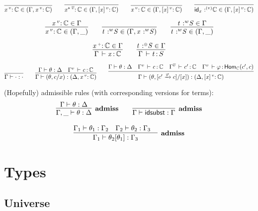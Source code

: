 \documentclass[11pt]{article}
\theoremstyle{plain}
\begin{document}
\[
\infer{\catvar{x}{v}{\C} \in (\Gamma,\catvar{x}{v}{\C})}
      {}
\qquad
\infer{\catvar{x^*}{\flip v}{\C} \in (\Gamma,\twcatvar{x}{v}{\C})}
      {}
\qquad
\infer{\catvar{x}{v}{\C} \in (\Gamma,\twcatvar{x}{v}{\C})}
      {}
\qquad
\infer{\tpvar{\idm x}{(v)}{\C} \in (\Gamma,\twcatvar{x}{v}{\C})}
      {}
\]

\[
\infer{\catvar{x}{v}{\C} \in (\Gamma,\_)}
      {\catvar{x}{v}{\C} \in \Gamma}
\qquad
\infer{\tpvar{t}{w}{S} \in (\Gamma,\tpvar{x}{w}{S})}
      {}
\qquad
\infer{\tpvar{t}{w}{S} \in (\Gamma,\_)}
      {\tpvar{t}{w}{S} \in \Gamma}
\]

\[
\infer{\ofdtp{\Gamma}{x}{\C}}{\catvar{x}{\co}{\C} \in \Gamma}
\qquad
\infer{\oftp{\Gamma}{t}{S}}
      {\tpvar{t}{\coc}{S} \in \Gamma}
\]

\[
\infer{\wfsub{\Gamma}{\cdot}{\cdot}}{} 
\qquad
\infer{\wfsub{\Gamma}{(\theta,c/x)}{(\Delta,\catvar{x}{v}{\C})}}
      {\wfsub{\Gamma}{\theta}{\Delta} & 
        \ofdtp{\Gamma^v}{c}{\C}
      }
\qquad
\infer{\wfsub{\Gamma}{(\theta,\substtw{c'}{c}{\vfi}{x})}{(\Delta,\twcatvar{x}{v}{\C})}}
      {\wfsub{\Gamma}{\theta}{\Delta} & 
        \ofdtp{\Gamma^v}{c}{\C} &
        \ofdtp{\Gamma^{\flip v}}{c'}{\C} &
        \oftp{\Gamma^v}{\vfi}{\Hom{\C}{c'}{c}}
      }
\]

(Hopefully) admissible rules (with corresponding versions for terms):   
\[
\begin{array}{c}
\infer[\admiss]
      {\wfsub{\Gamma,\_}{\theta}{\Delta}}
      {\wfsub{\Gamma}{\theta}{\Delta}}
\qquad
\infer[\admiss]
      {\wfsub{{\Gamma}}{\idsubst}{\Gamma}}
      {}
\\ \\
\infer[\admiss]
      {\wfsub{{\Gamma_1}}{\tsubst{\theta_2}{\theta_1}}{\Gamma_3}}
      {\wfsub{{\Gamma_1}}{\theta_1}{\Gamma_2} &
        \wfsub{{\Gamma_2}}{\theta_2}{\Gamma_3} &
      }
\end{array}
\]

\section{Types}

\subsection{Universe}
\end{document}
